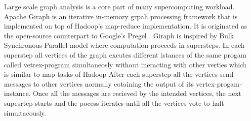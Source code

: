 Large scale graph analysis is a core part of many supercomputing workload.
Apache Giraph is an iterative in-memory grpah processing framework that is implemented on top of Hadoop's map-reduce implementation.
It is originated as the open-source counterpart to Google's Pregel \cite{fw:pregel}.
Giraph is inspired by Bulk Synchronous Parallel model \cite{fw:bsp} where computation proceeds in supersteps.
In each superstep all vertices of the graph excutes different istances of the same progam called vetrex-program simultaneosly without ineracting with other verties which is similar to map tasks of Hadoop
After each superstep all the vertices send messages to other vertices normally cotaining the output of its vertex-progam-instance.
Once all the messages are recieved by the intended vertices, the next supesrtep starts and the pocess iterates until all the vertices vote to halt simultaeously.



